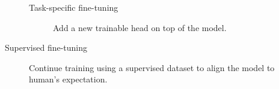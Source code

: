 \begin{description}
\begin{description}
\begin{description}
                    \item[Task-specific fine-tuning] 
                        Add a new trainable head on top of the model.
                \end{description}

            \item[Supervised fine-tuning] 
                Continue training using a supervised dataset to align the model to human's expectation.
        \end{description}
\end{description}